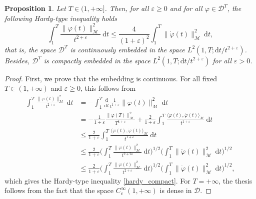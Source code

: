 \documentclass[a4paper,10pt]{amsart}
\newcommand{\ud}{\mathrm{d}}
\theoremstyle{plain}
\newtheorem{prop}[thm]{Proposition}
\theoremstyle{definition}
\numberwithin{equation}{section}
\numberwithin{thm}{section}
\begin{document}
\begin{prop}
\label{prop:compact_emb}
    Let $T\in(1,+\infty]$. Then, for all $\varepsilon \ge0$ and for all $\varphi\in\mathcal{D}^T$, the following Hardy-type inequality holds
    \begin{equation}\label{hardy_compact}
        \int_{1}^{T} \frac{\|\varphi(t)\|_\mathcal{M}^2}{t^{2+\varepsilon}}\ \ud t \leq \frac{4}{(1+\varepsilon)^2} \int_{1}^{T} \|\dot{\varphi}(t)\|_\mathcal{M}^2\ \ud t,
    \end{equation}
    that is, the space $\mathcal{D}^T$ is continuously embedded in the space $L^2(1,T;\ud t/t^{2+\varepsilon})$. Besides, $\mathcal{D}^T$ is compactly embedded in the space $L^2(1,T; \ud t/t^{2+\varepsilon})$ for all $\varepsilon>0$.
\end{prop}
\begin{proof}
    First, we prove that the embedding is continuous. For all fixed $T\in(1,+\infty)$ and $\varepsilon\ge0$, this follows from
    \[
    \begin{split}
        \int_{1}^{T} \frac{\|\varphi(t)\|_\mathcal{M}^2}{t^{2+\varepsilon}}\ \ud t & = -\int_{1}^{T} \frac{\ud}{\ud t}\frac{1}{t^{1+\varepsilon}}\|\varphi(t)\|_\mathcal{M}^2\ \ud t \\
        & = -\frac{1}{1+\varepsilon}\frac{\|\varphi(T)\|_\mathcal{M}^2}{T^{1+\varepsilon}} + \frac{2}{1+\varepsilon}\int_{1}^{T} \frac{\langle \varphi(t),\dot{\varphi}(t)\rangle_\mathcal{M}}{t^{1+\varepsilon}}\ \ud t\\
        &\leq \frac{2}{1+\varepsilon}\int_{1}^{T} \frac{\langle \varphi(t),\dot{\varphi}(t)\rangle_\mathcal{M}}{t^{1+\varepsilon}}\ \ud t\\
        &\leq \frac{2}{1+\varepsilon}\bigg( \int_{1}^{T} \frac{\|\varphi(t)\|_\mathcal{M}^2}{t^{2+2\varepsilon}}\ \ud t \bigg)^{1/2} \bigg( \int_{1}^{T} \|\dot{\varphi}(t)\|_\mathcal{M}^2\ \ud t \bigg)^{1/2}\\
        &\leq \frac{2}{1+\varepsilon}\bigg( \int_{1}^{T} \frac{\|\varphi(t)\|_\mathcal{M}^2}{t^{2+\varepsilon}}\ \ud t \bigg)^{1/2} \bigg( \int_{1}^{T} \|\dot{\varphi}(t)\|_\mathcal{M}^2\ \ud t \bigg)^{1/2},
    \end{split}
    \]
    which gives the Hardy-type inequality \eqref{hardy_compact}. For $T=+\infty$, the thesis follows from the fact that the space $C_c^\infty(1,+\infty)$ is dense in $\mathcal{D}$.


\end{proof}
\end{document}
